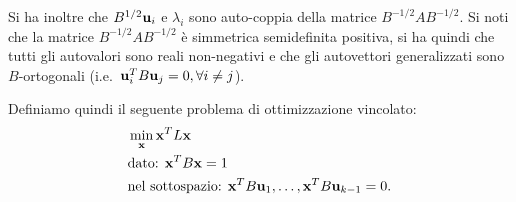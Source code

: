 \documentclass[10pt,a4paper]{article}
\begin{document}
Si ha inoltre che \(B^{1/2}\vb{u}_i\) e \(\lambda_i\) sono auto-coppia della matrice \(B^{-1/2} A B^{-1/2}\).
Si noti che la matrice \(B^{-1/2} A B^{-1/2}\) è simmetrica semidefinita positiva, si ha quindi che tutti gli autovalori sono reali non-negativi e che gli autovettori generalizzati sono \(B\)-ortogonali (i.e.\  \(\vb{u}_i^T B \vb{u}_j = 0, \forall i \neq j\)).

Definiamo quindi il seguente problema di ottimizzazione vincolato:
\begin{align}
    & \min_{\vb{x}} \vb{x}^T L\vb{x} \label{eq:definition}\\
    & \text{dato: } \vb{x}^T B\vb{x} = 1 \\
    & \text{nel sottospazio: } \vb{x}^T B \vb{u}_1,\ldots, \vb{x}^T B \vb{u}_{k-1} = 0.
\end{align}
\end{document}
